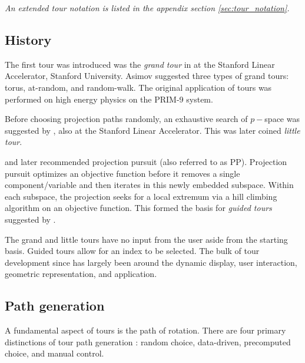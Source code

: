 \documentclass{monashthesis}
\begin{document}
\emph{An extended tour notation is listed in the appendix section \ref{sec:tour_notation}.}

\hypertarget{history}{%
\subsection{History}\label{history}}

The first tour was introduced was the \emph{grand tour} in \textcite{asimov_grand_1985} at the Stanford Linear Accelerator, Stanford University. Asimov suggested three types of grand tours: torus, at-random, and random-walk. The original application of tours was performed on high energy physics on the PRIM-9 system.

Before choosing projection paths randomly, an exhaustive search of \(p-\)space was suggested by \textcite{mcdonald_interactive_1982}, also at the Stanford Linear Accelerator. This was later coined \emph{little tour}.

\textcite{friedman_projection_1974} and later \textcite{huber_projection_1985} recommended projection pursuit (also referred to as PP). Projection pursuit optimizes an objective function before it removes a single component/variable and then iterates in this newly embedded subspace. Within each subspace, the projection seeks for a local extremum via a hill climbing algorithm on an objective function. This formed the basis for \emph{guided tours} suggested by \textcite{hurley_analyzing_1990}.

The grand and little tours have no input from the user aside from the starting basis. Guided tours allow for an index to be selected. The bulk of tour development since has largely been around the dynamic display, user interaction, geometric representation, and application.

\hypertarget{sec:path_generation}{%
\subsection{Path generation}\label{sec:path_generation}}

A fundamental aspect of tours is the path of rotation. There are four primary distinctions of tour path generation \autocite{buja_computational_2005}: random choice, data-driven, precomputed choice, and manual control.
\end{document}
